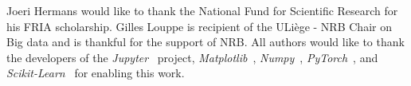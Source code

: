\documentclass{article}
\begin{document}
\begin{ack}
  Joeri Hermans would like to thank the National Fund for Scientific Research for his FRIA scholarship.
  Gilles Louppe is recipient of the ULiège - NRB Chair on Big data and is thankful for the support of NRB.
  All authors would like to thank the developers of the \emph{Jupyter}~\citep{jupyter} project, \emph{Matplotlib}~\citep{matplotlib},
  \emph{Numpy}~\citep{numpy}, \emph{PyTorch}~\citep{paszke2017automatic},
  and \emph{Scikit-Learn}~\citep{scikit-learn} for enabling this work.
\end{ack}



\end{document}
